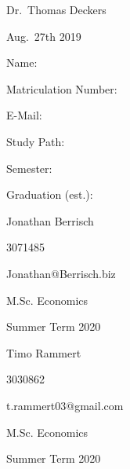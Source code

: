 \documentclass[11pt,]{article}
\begin{document}
\begin{titlepage}
  \noindent\begin{minipage}[t]{0.3\textwidth}
  \end{minipage}
  \begin{minipage}[t]{0.7\textwidth}
  \hspace{1cm}Dr.~Thomas Deckers
  \end{minipage}

  \noindent\begin{minipage}[t]{0.3\textwidth}
  \end{minipage}
  \begin{minipage}[t]{0.7\textwidth}
  \hspace{1cm}Aug.~27th 2019
  \end{minipage}

  \hrulefill

  \begin{multicols}{3}

  Name:

  Matriculation Number:

  E-Mail:

  Study Path:

  Semester:

  Graduation (est.):

  \columnbreak

  Jonathan Berrisch

  3071485

  Jonathan@Berrisch.biz

  M.Sc. Economics


  Summer Term 2020

  \columnbreak

  Timo Rammert

  3030862

  t.rammert03@gmail.com

  M.Sc. Economics


  Summer Term 2020

  \end{multicols}

\end{titlepage}



{
\hypersetup{linkcolor=black}

\setcounter{tocdepth}{3}
\tableofcontents
}
\end{document}
